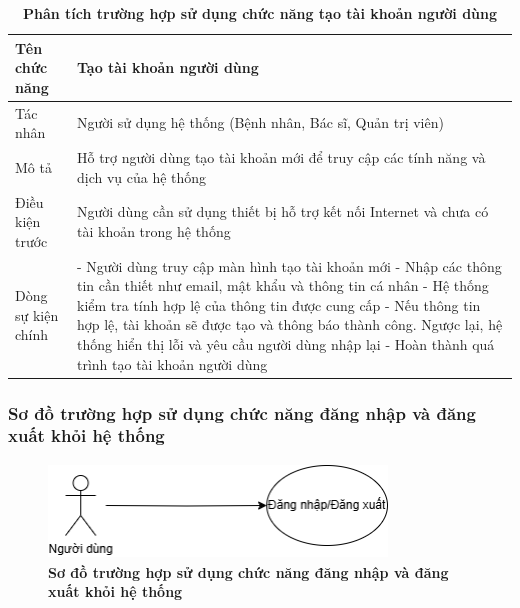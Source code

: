 \begin{table}[H]
	\caption{\bfseries \fontsize{12pt}{0pt}\selectfont Phân tích trường hợp sử dụng chức năng tạo tài khoản người dùng}
	\centering
	\begin{tabularx}{\textwidth}{|X|X|}
		\hline
		\textbf{Tên chức năng} & \textbf{Tạo tài khoản người dùng}                                                           \\
		\hline
		Tác nhân               & Người sử dụng hệ thống (Bệnh nhân, Bác sĩ, Quản trị viên)                                   \\
		\hline
		Mô tả                  & Hỗ trợ người dùng tạo tài khoản mới để truy cập các tính năng và dịch vụ của hệ thống       \\
		\hline
		Điều kiện trước        & Người dùng cần sử dụng thiết bị hỗ trợ kết nối Internet và chưa có tài khoản trong hệ thống \\
		\hline
		Dòng sự kiện chính     &
		- Người dùng truy cập màn hình tạo tài khoản mới \newline
		- Nhập các thông tin cần thiết như email, mật khẩu và thông tin cá nhân \newline
		- Hệ thống kiểm tra tính hợp lệ của thông tin được cung cấp \newline
		- Nếu thông tin hợp lệ, tài khoản sẽ được tạo và thông báo thành công. Ngược lại, hệ thống hiển thị lỗi và yêu cầu người dùng nhập lại \newline
		- Hoàn thành quá trình tạo tài khoản người dùng                                                                      \\
		\hline
	\end{tabularx}
\end{table}

\subsubsection{Sơ đồ trường hợp sử dụng chức năng đăng nhập và đăng xuất khỏi hệ thống}

\begin{figure}[H]
	\centering
	\includegraphics[width=9cm,height=2.5cm]{Images/use_case/use_case_login_logout.png}
	\caption[Sơ đồ trường hợp sử dụng chức năng đăng nhập và đăng xuất khỏi hệ thống]{\bfseries \fontsize{12pt}{0pt}
		\selectfont Sơ đồ trường hợp sử dụng chức năng đăng nhập và đăng xuất khỏi hệ thống}
	\label{use_case_login_logout} %
\end{figure}

